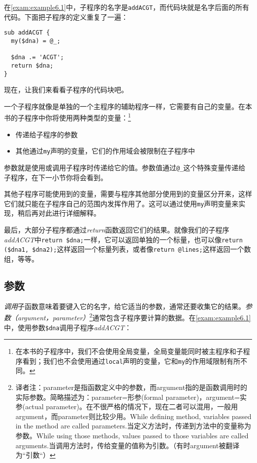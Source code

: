 在\autoref{exam:example6.1}中，子程序的名字是\verb|addACGT|，而代码块就是名字后面的所有代码。下面把子程序的定义重复了一遍：

\begin{lstlisting}
sub addACGT {
  my($dna) = @_;

  $dna .= 'ACGT';
  return $dna;
}
\end{lstlisting}

现在，让我们来看看子程序的代码块吧。

一个子程序就像是单独的一个主程序的辅助程序一样，它需要有自己的变量。在本书的子程序中你将使用两种类型的变量：\footnote{在本书的子程序中，我们不会使用全局变量，全局变量能同时被主程序和子程序看到；我们也不会使用通过\verb|local|声明的变量，它和\verb|my|的作用域限制有所不同。}

\begin{itemize}
  \item 传递给子程序的参数
  \item 其他通过\verb|my|声明的变量，它们的作用域会被限制在子程序中
\end{itemize}

参数就是使用或调用子程序时传递给它的值。参数值通过\verb|@_|这个特殊变量传递给子程序，在下一小节你将会看到。

其他子程序可能使用到的变量，需要与程序其他部分使用到的变量区分开来，这样它们就只能在子程序自己的范围内发挥作用了。这可以通过使用\verb|my|声明变量来实现，稍后再对此进行详细解释。

最后，大部分子程序都通过\textit{return}函数返回它们的结果。就像我们的子程序\textit{addACGT}中\verb|return $dna;|一样，它可以返回单独的一个标量，也可以像\verb|return ($dna1, $dna2);|这样返回一个标量列表，或者像\verb|return @lines;|这样返回一个数组，等等。

\subsection{参数}
\textit{调用}子函数意味着要键入它的名字，给它适当的参数，通常还要收集它的结果。\textit{参数（argument，parameter）}\footnote{译者注：parameter是指函数定义中的参数，而argument指的是函数调用时的实际参数。简略描述为：parameter=形参(formal parameter)，argument=实参(actual parameter)。在不很严格的情况下，现在二者可以混用，一般用argument，而parameter则比较少用。While defining method, variables passed in the method are called parameters.当定义方法时，传递到方法中的变量称为参数。While using those methods, values passed to those variables are called arguments.当调用方法时，传给变量的值称为引数。（有时argument被翻译为“引数“）}通常包含子程序要计算的数据。在\autoref{exam:example6.1}中，使用参数\verb|$dna|调用子程序\textit{addACGT}：


